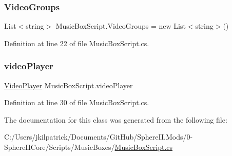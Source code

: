 \subsubsection{\texorpdfstring{VideoGroups}{VideoGroups}}
{\footnotesize\ttfamily List$<$string$>$ Music\+Box\+Script.\+Video\+Groups = new List$<$string$>$()}



Definition at line 22 of file Music\+Box\+Script.\+cs.

\mbox{\label{class_music_box_script_a1b67f8837e4d93c47a7e07f1870b4a18}} 
\subsubsection{\texorpdfstring{videoPlayer}{videoPlayer}}
{\footnotesize\ttfamily \mbox{\hyperlink{_sphere_i_i_01_music_01_boxes_2_config_2_localization_8txt_a56e37348dc5b6d24d95c96cebefe15af}{Video\+Player}} Music\+Box\+Script.\+video\+Player}



Definition at line 30 of file Music\+Box\+Script.\+cs.



The documentation for this class was generated from the following file\+:\begin{DoxyCompactItemize}
\item 
C\+:/\+Users/jkilpatrick/\+Documents/\+Git\+Hub/\+Sphere\+I\+I.\+Mods/0-\/\+Sphere\+I\+I\+Core/\+Scripts/\+Music\+Boxes/\mbox{\hyperlink{_music_box_script_8cs}{Music\+Box\+Script.\+cs}}\end{DoxyCompactItemize}
